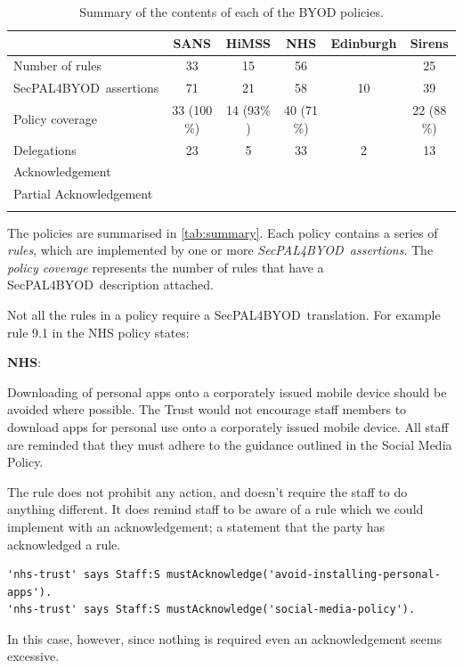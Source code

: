 \documentclass{llncs}
\newcommand{\AppPAL}[0]{SecPAL4BYOD}
\newenvironment{policyrule}[1]{%
  \begin{mdframed}\footnotesize
      \noindent\textbf{\sffamily #1}:~\itshape%
}{%
  \end{mdframed}
}
\begin{document}
\begin{table}\centering\footnotesize\sffamily
  \begin{tabular}{l c c c c c}
    \toprule
                             & {SANS}       & {HiMSS}     & {NHS}       & {Edinburgh} & {Sirens}    \\
    \midrule
    Number of rules          & 33           & 15          & 56          &             & 25          \\
    \AppPAL~assertions       & 71           & 21          & 58          & 10          & 39          \\
    Policy coverage          & 33 (100$\%$) & 14 (93$\%$) & 40 (71$\%$) &             & 22 (88$\%$) \\
    \midrule
    Delegations              & 23           & 5           & 33          & 2           & 13          \\
    Acknowledgement          &              &             &             &             &             \\
    Partial Acknowledgement  &              &             &             &             &             \\
    \bottomrule             \\
  \end{tabular}
  \label{tab:summary}
  \caption{Summary of the contents of each of the BYOD policies.}
\end{table}

The policies are summarised in \autoref{tab:summary}.
Each policy contains a series of \emph{rules}, which are implemented by one or more \emph{\AppPAL~assertions}.
The \emph{policy coverage} represents the number of rules that have a \AppPAL~description attached.

Not all the rules in a policy require a \AppPAL~translation.
For example rule 9.1 in the NHS policy states:
\begin{policyrule}{NHS}
  Downloading of personal apps onto a corporately issued mobile device should be avoided where possible.
  The Trust would not encourage staff members to download apps for personal use onto a corporately issued mobile device.
  All staff are reminded that they must adhere to the guidance outlined in the Social Media Policy.
\end{policyrule}
The rule does not prohibit any action, and doesn't require the staff to do anything different.
It does remind staff to be aware of a rule which we could implement with an acknowledgement; a statement that the party has acknowledged a rule.
\begin{lstlisting}
'nhs-trust' says Staff:S mustAcknowledge('avoid-installing-personal-apps').
'nhs-trust' says Staff:S mustAcknowledge('social-media-policy').
\end{lstlisting}
In this case, however, since nothing is required even an acknowledgement seems excessive.
\end{document}
